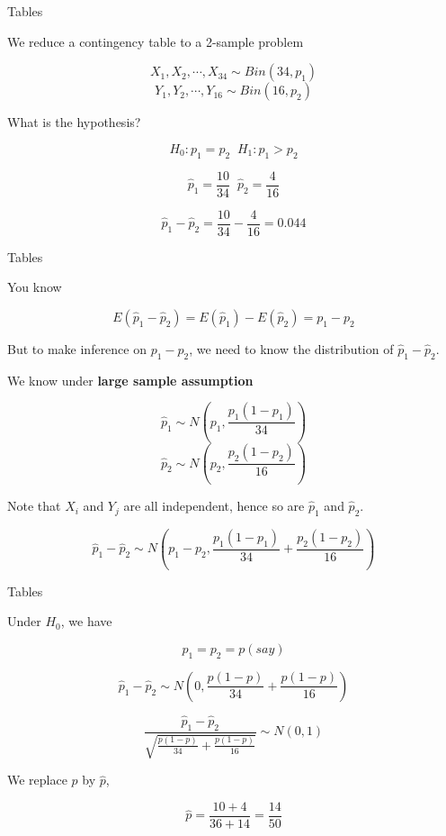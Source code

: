 \documentclass{beamer}\usepackage[]{graphicx}\usepackage[]{color}
\begin{document}
\begin{frame}[fragile]{Tables}

We reduce a contingency table to a 2-sample problem 

$$ X_{1}, X_{2}, \cdots, X_{34} \sim Bin (34, p_1) $$
$$ Y_{1}, Y_{2}, \cdots, Y_{16} \sim Bin (16, p_2) $$ \pause

What is the hypothesis?

$$ H_{0}: p_{1} = p_{2}  \;\; H_{1}: p_{1} > p_{2} $$ \pause

$$ \hat{p}_{1} = \frac{10}{34} \;\; \hat{p}_{2} = \frac{4}{16}  $$ \pause

$$ \hat{p}_{1} - \hat{p}_{2} = \frac{10}{34} - \frac{4}{16} = 0.044 $$

\end{frame}

\begin{frame}[fragile]{Tables}

You know 

$$ E (\hat{p}_{1} - \hat{p}_{2}) = E(\hat{p}_1) - E(\hat{p}_2) = p_{1} - p_{2} $$ \pause

But to make inference on $p_{1} - p_{2}$, we need to know the distribution of $\hat{p}_{1} - \hat{p}_{2}$. 

We know under \textbf{large sample assumption}

$$ \hat{p}_{1} \sim N(p_1, \frac{p_1(1-p_1)}{34}) $$
$$ \hat{p}_{2} \sim N(p_2, \frac{p_2(1-p_2)}{16}) $$ 

Note that $X_{i}$ and $Y_{j}$ are all independent, hence so are $\hat{p}_{1}$ and $\hat{p}_{2}$.

$$ \hat{p}_{1} - \hat{p}_{2} \sim N \left( p_1 - p_2, \frac{p_1(1-p_1)}{34} + \frac{p_2(1-p_2)}{16} \right ) $$

\end{frame}

\begin{frame}[fragile]{Tables}

Under $H_{0}$, we have 

$$ p_{1} = p_{2} = p (say)$$

$$ \hat{p}_{1} - \hat{p}_{2} \sim N \left(0, \frac{p(1-p)}{34} + \frac{p(1-p)}{16} \right ) $$

$$ \frac{\hat{p}_{1} - \hat{p}_{2}}{\sqrt{\frac{p(1-p)}{34} + \frac{p(1-p)}{16}}} \sim N(0,1) $$


We replace $p$ by $\hat{p}$,

$$ \hat{p} = \frac{10+4}{36+14} = \frac{14}{50} $$

\end{frame}
\end{document}
